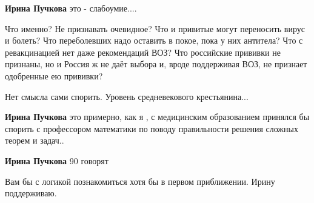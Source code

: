 \begin{itemize}
\begin{itemize}
\textbf{Ирина Пучкова} это - слабоумие....

 
Что именно? Не признавать очевидное? Что и привитые могут переносить вирус и болеть? Что переболевших надо оставить в покое, пока у них антитела? Что с ревакцинацией нет даже рекомендаций ВОЗ? Что российские прививки не признаны, но и Россия ж не даёт выбора и, вроде поддерживая ВОЗ, не признает одобренные ею прививки?

 
Нет смысла сами спорить. Уровень средневекового крестьянина...

 
\textbf{Ирина Пучкова} это примерно, как я , с медицинским образованием принялся бы спорить с профессором математики по поводу правильности решения сложных теорем и задач..

 
\textbf{Ирина Пучкова} 90 говорят

 
Вам бы с логикой познакомиться хотя бы в первом приближении. Ирину поддерживаю.

 

\end{itemize}
\end{itemize}

